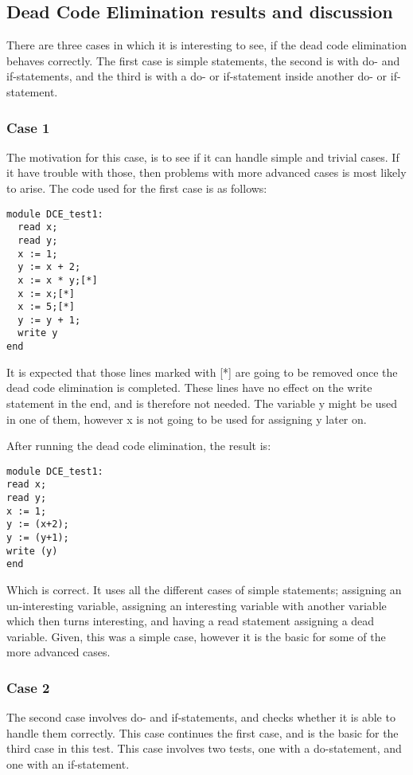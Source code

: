 
\subsection{Dead Code Elimination results and discussion}
\label{dce_test_results}

There are three cases in which it is interesting to see, if the dead code elimination behaves correctly. The first case is simple statements, the second is with do- and if-statements, and the third is with a do- or if-statement inside another do- or if-statement.

\subsubsection{Case 1}
The motivation for this case, is to see if it can handle simple and trivial cases. If it have trouble with those, then problems with more advanced cases is most likely to arise. The code used for the first case is as follows:
\begin{lstlisting}
module DCE_test1:
  read x;
  read y;
  x := 1;
  y := x + 2;
  x := x * y;[*]
  x := x;[*]
  x := 5;[*]
  y := y + 1;
  write y
end
\end{lstlisting}
It is expected that those lines marked with [*] are going to be removed once the dead code elimination is completed. These lines have no effect on the write statement in the end, and is therefore not needed. The variable y might be used in one of them, however x is not going to be used for assigning y later on.

After running the dead code elimination, the result is:
\begin{lstlisting}
module DCE_test1:
read x;
read y;
x := 1;
y := (x+2);
y := (y+1);
write (y)
end
\end{lstlisting}
Which is correct. It uses all the different cases of simple statements; assigning an un-interesting variable, assigning an interesting variable with another variable which then turns interesting, and having a read statement assigning a dead variable. Given, this was a simple case, however it is the basic for some of the more advanced cases.

\subsubsection{Case 2}
The second case involves do- and if-statements, and checks whether it is able to handle them correctly. This case continues the first case, and is the basic for the third case in this test. This case involves two tests, one with a do-statement, and one with an if-statement.

